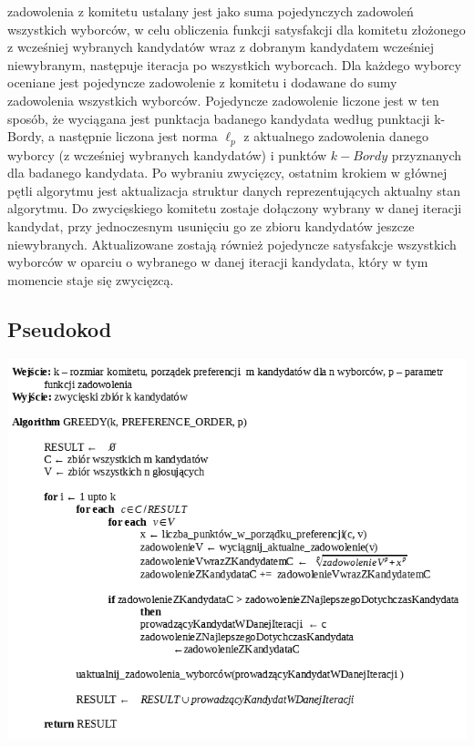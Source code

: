 \documentclass[pdflatex,11pt]{../aghdoc_version2}
\begin{document}
zadowolenia z komitetu ustalany jest jako suma pojedynczych zadowoleń wszystkich
wyborców, w celu obliczenia funkcji satysfakcji dla komitetu złożonego z wcześniej
wybranych kandydatów wraz z dobranym kandydatem wcześniej niewybranym, następuje
iteracja po wszystkich wyborcach. Dla każdego wyborcy oceniane jest pojedyncze
zadowolenie z komitetu i dodawane do sumy zadowolenia wszystkich wyborców.
Pojedyncze zadowolenie liczone jest w ten sposób, że wyciągana jest punktacja badanego
kandydata według punktacji k-Bordy, a następnie liczona jest norma $\ell_p$ z aktualnego
zadowolenia danego wyborcy (z wcześniej wybranych kandydatów) i punktów $k-Bordy$
przyznanych dla badanego kandydata. Po wybraniu zwycięzcy, ostatnim krokiem w głównej
pętli algorytmu jest aktualizacja struktur danych reprezentujących aktualny stan algorytmu.
Do zwycięskiego komitetu zostaje dołączony wybrany w danej iteracji kandydat, przy
jednoczesnym usunięciu go ze zbioru kandydatów jeszcze niewybranych. Aktualizowane
zostają również pojedyncze satysfakcje wszystkich wyborców w oparciu o wybranego w
danej iteracji kandydata, który w tym momencie staje się zwycięzcą.

\subsection{Pseudokod}
\begin{center}
\centerline{\includegraphics[scale=0.9]{pics/pseudocode_greedy_algorithm.png}}
\end{center}
\end{document}
